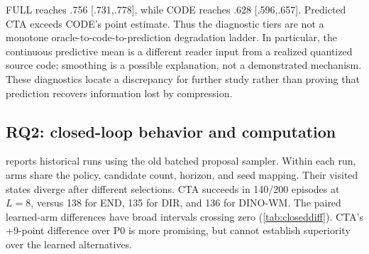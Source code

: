 FULL reaches .756 [.731,.778], while CODE reaches .628 [.596,.657]. Predicted CTA exceeds CODE's point estimate. Thus the diagnostic tiers are not a monotone oracle-to-code-to-prediction degradation ladder. In particular, the continuous predictive mean is a different reader input from a realized quantized source code; smoothing is a possible explanation, not a demonstrated mechanism. These diagnostics locate a discrepancy for further study rather than proving that prediction recovers information lost by compression.

\subsection{RQ2: closed-loop behavior and computation}
\label{sec:closed}
 reports historical runs using the old batched proposal sampler. Within each run, arms share the policy, candidate count, horizon, and seed mapping. Their visited states diverge after different selections. CTA succeeds in 140/200 episodes at $L=8$, versus 138 for END, 135 for DIR, and 136 for DINO-WM. The paired learned-arm differences have broad intervals crossing zero (\cref{tab:closeddiff}). CTA's +9-point difference over P0 is more promising, but cannot establish superiority over the learned alternatives.

